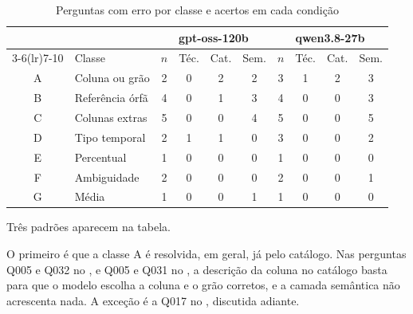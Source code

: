 \begin{table}[htb]
  \centering
  \caption{Perguntas com erro por classe e acertos em cada condição}
  \label{tab:classes}
  \begin{tabular}{clcccccccc}
    \toprule
    & & \multicolumn{4}{c}{gpt-oss-120b} & \multicolumn{4}{c}{qwen3.8-27b} \\
    \cmidrule(lr){3-6}\cmidrule(lr){7-10}
    & Classe & $n$ & Téc. & Cat. & Sem. & $n$ & Téc. & Cat. & Sem. \\
    \midrule
    A & Coluna ou grão     & 2 & 0 & 2 & 2 & 3 & 1 & 2 & 3 \\
    B & Referência órfã    & 4 & 0 & 1 & 3 & 4 & 0 & 0 & 3 \\
    C & Colunas extras     & 5 & 0 & 0 & 4 & 5 & 0 & 0 & 5 \\
    D & Tipo temporal      & 2 & 1 & 1 & 0 & 3 & 0 & 0 & 2 \\
    E & Percentual         & 1 & 0 & 0 & 0 & 1 & 0 & 0 & 0 \\
    F & Ambiguidade        & 2 & 0 & 0 & 0 & 2 & 0 & 0 & 1 \\
    G & Média              & 1 & 0 & 0 & 1 & 1 & 0 & 0 & 0 \\
    \bottomrule
  \end{tabular}
\end{table}


Três padrões aparecem na tabela.

O primeiro é que a classe A é resolvida, em geral, já pelo catálogo. Nas
perguntas Q005 e Q032 no , e Q005 e Q031 no
, a descrição da coluna no catálogo basta para que o
modelo escolha a coluna e o grão corretos, e a camada semântica não
acrescenta nada. A exceção é a Q017 no , discutida
adiante.

